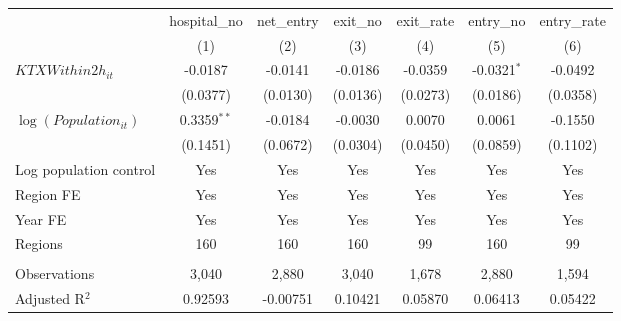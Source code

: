 \begingroup
\centering
\begin{tabular}{lcccccc}
   \toprule
                            & hospital\_no  & net\_entry  & exit\_no  & exit\_rate  & entry\_no     & entry\_rate \\    
                            & (1)           & (2)         & (3)       & (4)         & (5)           & (6)\\  
   \midrule 
   $KTXWithin2h_{it}$       & -0.0187       & -0.0141     & -0.0186   & -0.0359     & -0.0321$^{*}$ & -0.0492\\   
                            & (0.0377)      & (0.0130)    & (0.0136)  & (0.0273)    & (0.0186)      & (0.0358)\\   
   $\log(Population_{it})$  & 0.3359$^{**}$ & -0.0184     & -0.0030   & 0.0070      & 0.0061        & -0.1550\\   
                            & (0.1451)      & (0.0672)    & (0.0304)  & (0.0450)    & (0.0859)      & (0.1102)\\   
   Log population control   & Yes           & Yes         & Yes       & Yes         & Yes           & Yes\\  
   Region FE                & Yes           & Yes         & Yes       & Yes         & Yes           & Yes\\  
   Year FE                  & Yes           & Yes         & Yes       & Yes         & Yes           & Yes\\  
   Regions                  & 160           & 160         & 160       & 99          & 160           & 99\\  
    \\
   Observations             & 3,040         & 2,880       & 3,040     & 1,678       & 2,880         & 1,594\\  
   Adjusted R$^2$           & 0.92593       & -0.00751    & 0.10421   & 0.05870     & 0.06413       & 0.05422\\  
   \bottomrule
\end{tabular}
\par\endgroup
